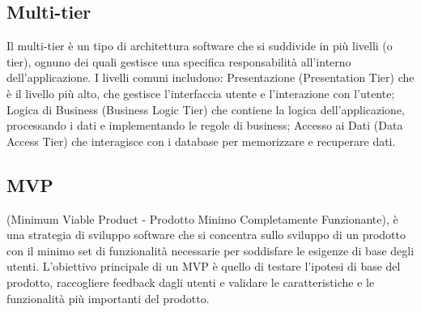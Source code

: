 \subsection*{Multi-tier} 
Il multi-tier è un tipo di architettura software che si suddivide in più livelli (o tier), ognuno dei quali gestisce una specifica responsabilità all'interno dell'applicazione. I livelli comuni includono: Presentazione (Presentation Tier) che è il livello più alto, che gestisce l'interfaccia utente e l'interazione con l'utente; Logica di Business (Business Logic Tier) che contiene la logica dell'applicazione, processando i dati e implementando le regole di business; Accesso ai Dati (Data Access Tier) che interagisce con i database per memorizzare e recuperare dati.
\subsection*{MVP} 
(Minimum Viable Product - Prodotto Minimo Completamente Funzionante), è una strategia di sviluppo software che si concentra sullo sviluppo di un prodotto con il minimo set di funzionalità necessarie per soddisfare le esigenze di base degli utenti. L'obiettivo principale di un MVP è quello di testare l'ipotesi di base del prodotto, raccogliere feedback dagli utenti e validare le caratteristiche e le funzionalità più importanti del prodotto.
